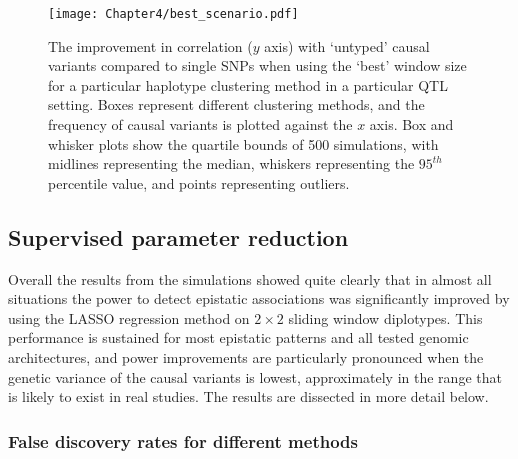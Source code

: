 

\begin{figure}
\begin{center}
\begin{center}
\texttt{[image: Chapter4/best\_scenario.pdf]}
\caption[Maximum improvement in variant detection using unsupervised methods]{The improvement in correlation ($y$ axis) with `untyped' causal variants compared to single SNPs when using the `best' window size for a particular haplotype clustering method in a particular QTL setting. Boxes represent different clustering methods, and the frequency of causal variants is plotted against the $x$ axis. Box and whisker plots show the quartile bounds of 500 simulations, with midlines representing the median, whiskers representing the $95^{th}$ percentile value, and points representing outliers.}
\label{fig:best_scenario}
\end{center}
\end{center}
\end{figure}

\subsection{Supervised parameter reduction}

Overall the results from the simulations showed quite clearly that in almost all situations the power to detect epistatic associations was significantly improved by using the LASSO regression method on $2 \times 2$ sliding window diplotypes. This performance is sustained for most epistatic patterns and all tested genomic architectures, and power improvements are particularly pronounced when the genetic variance of the causal variants is lowest, approximately in the range that is likely to exist in real studies. The results are dissected in more detail below.

\subsubsection{False discovery rates for different methods}


